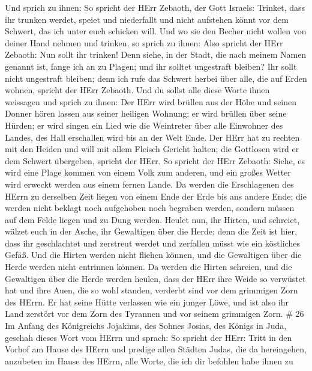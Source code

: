  Und sprich zu ihnen: So spricht der HErr Zebaoth, der Gott
Israels: Trinket, dass ihr trunken werdet, speiet und niederfallt und
nicht aufstehen könnt vor dem Schwert, das ich unter euch schicken will.
 Und wo sie den Becher nicht wollen von deiner Hand nehmen
und trinken, so sprich zu ihnen: Also spricht der HErr Zebaoth: Nun
sollt ihr trinken!  Denn siehe, in der Stadt, die nach
meinem Namen genannt ist, fange ich an zu Plagen; und ihr solltet
ungestraft bleiben? Ihr sollt nicht ungestraft bleiben; denn ich rufe
das Schwert herbei über alle, die auf Erden wohnen, spricht der HErr
Zebaoth.  Und du sollst alle diese Worte ihnen weissagen
und sprich zu ihnen: Der HErr wird brüllen aus der Höhe und seinen
Donner hören lassen aus seiner heiligen Wohnung; er wird brüllen über
seine Hürden; er wird singen ein Lied wie die Weintreter über alle
Einwohner des Landes, des Hall erschallen wird bis an der Welt Ende.
 Der HErr hat zu rechten mit den Heiden und will mit allem
Fleisch Gericht halten; die Gottlosen wird er dem Schwert übergeben,
spricht der HErr.  So spricht der HErr Zebaoth: Siehe, es
wird eine Plage kommen von einem Volk zum anderen, und ein großes Wetter
wird erweckt werden aus einem fernen Lande.  Da werden die
Erschlagenen des HErrn zu derselben Zeit liegen von einem Ende der Erde
bis ans andere Ende; die werden nicht beklagt noch aufgehoben noch
begraben werden, sondern müssen auf dem Felde liegen und zu Dung werden.
 Heulet nun, ihr Hirten, und schreiet, wälzet euch in der
Asche, ihr Gewaltigen über die Herde; denn die Zeit ist hier, dass ihr
geschlachtet und zerstreut werdet und zerfallen müsst wie ein köstliches
Gefäß.  Und die Hirten werden nicht fliehen können, und die
Gewaltigen über die Herde werden nicht entrinnen können. 
Da werden die Hirten schreien, und die Gewaltigen über die Herde werden
heulen, dass der HErr ihre Weide so verwüstet hat  und ihre
Auen, die so wohl standen, verderbt sind vor dem grimmigen Zorn des
HErrn.  Er hat seine Hütte verlassen wie ein junger Löwe,
und ist also ihr Land zerstört vor dem Zorn des Tyrannen und vor seinem
grimmigen Zorn. \# 26  Im Anfang des Königreichs Jojakims,
des Sohnes Josias, des Königs in Juda, geschah dieses Wort vom HErrn und
sprach:  So spricht der HErr: Tritt in den Vorhof am Hause
des HErrn und predige allen Städten Judas, die da hereingehen, anzubeten
im Hause des HErrn, alle Worte, die ich dir befohlen habe ihnen zu
